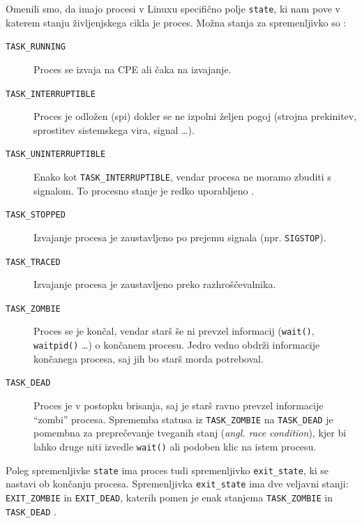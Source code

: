 \documentclass[a4paper,12pt,openright]{book}
\begin{document}
Omenili smo, da imajo procesi v Linuxu specifično polje \texttt{state}, ki nam pove v katerem stanju življenjskega cikla je proces.
Možna stanja za spremenljivko so \cite{Bovet_Cesati_2005}:
\begin{description}
	\item[\texttt{TASK\_RUNNING}] Proces se izvaja na CPE ali čaka na izvajanje.
	\item[\texttt{TASK\_INTERRUPTIBLE}] Proces je odložen (spi) dokler se ne izpolni željen pogoj (strojna prekinitev, sprostitev sistemskega vira, signal \dots).
	\item[\texttt{TASK\_UNINTERRUPTIBLE}] Enako kot \texttt{TASK\_INTERRUPTIBLE}, vendar procesa ne moramo zbuditi s signalom.
	To procesno stanje je redko uporabljeno \cite{Bovet_Cesati_2005}.
	\item[\texttt{TASK\_STOPPED}] Izvajanje procesa je zaustavljeno po prejemu signala (npr. \texttt{SIGSTOP}).
	\item[\texttt{TASK\_TRACED}] Izvajanje procesa je zaustavljeno preko razhroščevalnika.
	\item[\texttt{TASK\_ZOMBIE}] Proces se je končal, vendar starš še ni prevzel informacij (\texttt{wait()}, \texttt{waitpid()} \dots) o končanem procesu.
	Jedro vedno obdrži informacije končanega procesa, saj jih bo starš morda potreboval.
	\item[\texttt{TASK\_DEAD}] Proces je v postopku brisanja, saj je starš ravno prevzel informacije ``zombi'' procesa.
	Sprememba statusa iz \texttt{TASK\_ZOMBIE} na \texttt{TASK\_DEAD} je pomembna za preprečevanje tveganih stanj (\textit{angl. race condition}), kjer bi lahko druge niti izvedle \texttt{wait()} ali podoben klic na istem procesu.
\end{description}

Poleg spremenljivke \texttt{state} ima proces tudi spremenljivko \texttt{exit\_state}, ki se nastavi ob končanju procesa.
Spremenljivka \texttt{exit\_state} ima dve veljavni stanji: \texttt{EXIT\_ZOMBIE} in \texttt{EXIT\_DEAD}, katerih pomen je enak stanjema \texttt{TASK\_ZOMBIE} in \texttt{TASK\_DEAD} \cite{Bovet_Cesati_2005}.
\end{document}
